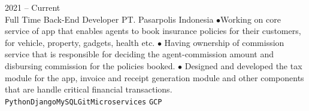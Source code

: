\documentclass[9pt]{developercv} %
\begin{document}
\begin{entrylist}
		\entry
	{2021 -- Current\\\footnotesize{Full Time}}
	{Back-End Developer}
	{PT. Pasarpolis Indonesia}
	{$\bullet$Working on core service of app that enables agents to book insurance policies for their customers, for vehicle, property, gadgets, health  etc. $\bullet$ Having ownership of commission service that is responsible for deciding the agent-commission amount and disbursing commission for the policies booked. $\bullet$ Designed and developed the tax module for the app, invoice and receipt generation module and other components that are handle critical financial transactions.\\ \texttt{Python}\slashsep\texttt{Django}\slashsep\texttt{MySQL}\slashsep\texttt{Git}\slashsep\texttt{Microservices} \slashsep\texttt{GCP}}
	

\end{entrylist}
\end{document}
